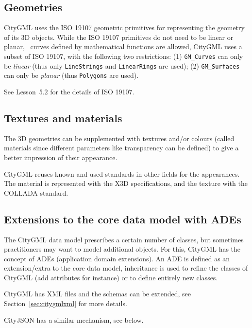 \subsection{Geometries}

CityGML uses the ISO 19107 geometric primitives for representing the geometry of its 3D objects.
While the ISO 19107 primitives do not need to be linear or planar, \ie\ curves defined by mathematical functions are allowed, CityGML uses a subset of ISO 19107, with the following two restrictions: (1) \texttt{GM\_Curves} can only be \emph{linear} (thus only \texttt{LineStrings} and \texttt{LinearRings} are used); (2) \texttt{GM\_Surfaces} can only be \emph{planar} (thus \texttt{Polygons} are used).

See Lesson~5.2 for the details of ISO 19107.


\subsection{Textures and materials}
The 3D geometries can be supplemented with textures and/or colours (called materials since different parameters like transparency can be defined) to give a better impression of their appearance.

CityGML reuses known and used standards in other fields for the appearances.
The material is represented with the X3D specifications, and the texture with the COLLADA standard.


\subsection{Extensions to the core data model with ADEs} 

The CityGML data model prescribes a certain number of classes, but sometimes practitioners may want to model additional objects.
For this, CityGML has the concept of ADEs (application domain extensions).
An ADE is defined as an extension/extra to the core data model, inheritance is used to refine the classes of CityGML (add attributes for instance) or to define entirely new classes.

CityGML has XML files and the schemas can be extended, see Section~\ref{sec:citygmlxml} for more details. 

CityJSON has a similar mechanism, see below.




